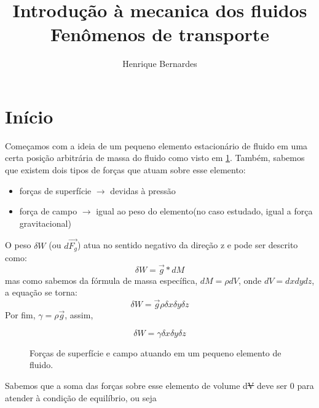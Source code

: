 \documentclass{article}
\begin{document}
\title{Introdução à mecanica dos fluidos \\ Fenômenos de transporte}
\author{Henrique Bernardes}
\maketitle \thispagestyle{empty}

\section{Início}
Começamos com a ideia de um pequeno elemento estacionário de fluido em uma certa posição arbitrária de massa do fluido como visto em \ref{fig:forcasuperficieecampo}. Também, sabemos que existem dois tipos de forças que atuam sobre esse elemento:
\begin{itemize}
     \item forças de superfície \( \rightarrow \) devidas à pressão
     \item força de campo \( \rightarrow \) igual ao peso do elemento(no caso estudado, igual a força gravitacional)
\end{itemize}

O peso \( \delta W\) (ou \( d\vec{F_g}\)) atua no sentido negativo da direção z e pode ser descrito como:
 \begin{equation}
      \delta W = \vec{g}*dM 
 \end{equation}
mas como sabemos da fórmula de massa específica, \( dM = \rho dV \), onde \( dV= dxdydz\), a equação se torna:
\begin{equation}
     \delta W = \vec{g} \rho  \delta x \delta y \delta z
\end{equation}
Por fim, \( \gamma = \rho \vec{g}\), assim,

\begin{equation}
     \delta W = \gamma  \delta x \delta y \delta z
\end{equation}


\begin{figure}[!h]
     \centering
     \def\svgwidth{0.4\textwidth}
     
     \caption{\label{fig:forcasuperficieecampo} Forças de superfície e campo atuando em um pequeno elemento de fluido.}
     \hfill
\end{figure}
 

Sabemos que a soma das forças sobre esse elemento de volume d\sout{V} deve ser 0 para atender à condição de equilíbrio, ou seja
\end{document}
